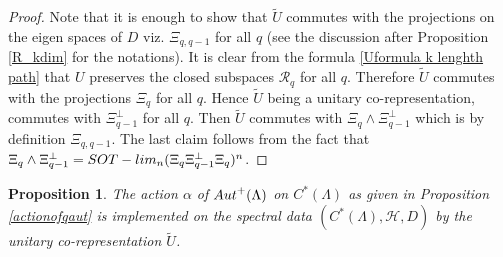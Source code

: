 \documentclass{amsart}
\theoremstyle{plain}
\newtheorem{proposition}[subsection]{Proposition}
\theoremstyle{definition}
\theoremstyle{remark}
\numberwithin{equation}{section}
\newcommand{\cal}{\mathcal}
\newcommand{\clh}{{\cal H}}
\newcommand{\clr}{{\cal R}}
\begin{document}
\begin{proof}
    Note that it is enough to show that $\widetilde{U}$ commutes with the projections on the eigen spaces of $D$ viz. $\Xi_{q,q-1}$ for all $q$ (see the discussion after Proposition \ref{R_kdim} for the notations). It is clear from the formula \ref{Uformula k lenghth path} that $U$ preserves the closed subspaces $\clr_{q}$ for all $q$. Therefore $\widetilde{U}$ commutes with the projections $\Xi_{q}$ for all $q$. Hence $\widetilde{U}$ being a unitary co-representation, commutes with $\Xi_{q-1}^{\perp}$ for all $q$. Then $\widetilde{U}$ commutes with $\Xi_{q}\wedge\Xi_{q-1}^{\perp}$ which is by definition $\Xi_{q,q-1}$. The last claim follows from the fact that $\Xi_{q}\wedge\Xi_{q-1}^{\perp}={\rm SOT-lim}_{n}(\Xi_{q}\Xi_{q-1}^{\perp}\Xi_{q})^n$.  
\end{proof}
\begin{proposition}
    \label{implementation}
    The action $\alpha$ of ${\rm Aut}^{+}(\Lambda)$ on $C^{\ast}(\Lambda)$ as given in Proposition \ref{actionofqaut} is implemented on the spectral data $(C^{\ast}(\Lambda),\clh,D)$ by the unitary co-representation $\widetilde{U}$.
\end{proposition}
\end{document}
